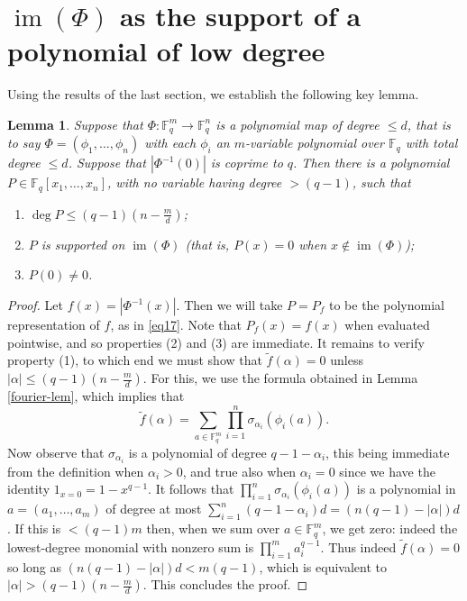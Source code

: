 \documentclass[12pt,reqno]{amsart}
\newtheorem{lemma}[theorem]{Lemma}
\theoremstyle{definition}
\renewcommand{\leq}{\leqslant}
\newcommand\im{\operatorname{im}}
\def\F{\mathbb{F}}
\numberwithin{equation}{section}
\begin{document}
\section{$\im(\Phi)$ as the support of a polynomial of low degree}

Using the results of the last section, we establish the following key lemma.

\begin{lemma}\label{lem3-main}
Suppose that $\Phi : \F_q^m \rightarrow \F_q^n$ is a polynomial map of degree $\leq d$, that is to say $\Phi = (\phi_1,\dots, \phi_n)$ with each $\phi_i$ an $m$-variable polynomial over $\F_q$ with total degree $\leq d$. Suppose that $|\Phi^{-1}(0)|$ is coprime to $q$. Then there is a polynomial $P \in \F_q[x_1,\dots, x_n]$, with no variable having degree $> (q - 1)$, such that \begin{enumerate}
\item $\deg P \leq (q - 1)(n - \frac{m}{d})$;
\item $P$ is supported on $\im(\Phi)$ \textup{(}that is, $P(x) = 0$ when $x \notin \im(\Phi)$\textup{)};
\item $P(0) \neq 0$.
\end{enumerate}
\end{lemma}
\begin{proof} Let $f(x) = |\Phi^{-1}(x)|$. Then we will take $P = P_f$ to be the polynomial representation of $f$, as in \eqref{eq17}. Note that $P_f(x) = f(x)$ when evaluated pointwise, and so properties (2) and (3) are immediate. It remains to verify property (1), to which end we must show that $\tilde f(\alpha) = 0$ unless $|\alpha| \leq  (q - 1)(n - \frac{m}{d})$. For this, we use the formula obtained in Lemma \ref{fourier-lem}, which implies that 
\[ \tilde f(\alpha) = \sum_{a \in \F_q^m} \prod_{i = 1}^n \sigma_{\alpha_i}(\phi_i(a)).\] Now observe that $\sigma_{\alpha_i}$ is a polynomial of degree $q - 1- \alpha_i$, this being immediate from the definition when $\alpha_i > 0$, and true also when $\alpha_{i} = 0$ since we have the identity $1_{x = 0} = 1 - x^{q - 1}$. It follows that $\prod_{i = 1}^n \sigma_{\alpha_i}(\phi_i(a))$ is a polynomial in $a = (a_1,\dots, a_m)$ of degree at most $\sum_{i = 1}^n (q - 1 - \alpha_i) d = (n(q - 1) - |\alpha|) d$. If this is $< (q - 1)m$ then, when we sum over $a \in \F_q^m$, we get zero: indeed the lowest-degree monomial with nonzero sum is $\prod_{i = 1}^m a_i^{q - 1}$. Thus indeed $\tilde f(\alpha) = 0$ so long as $(n(q - 1) - |\alpha|) d < m (q - 1)$, which is equivalent to $|\alpha| > (q - 1)(n - \frac{m}{d})$. This concludes the proof.\end{proof}
\end{document}
